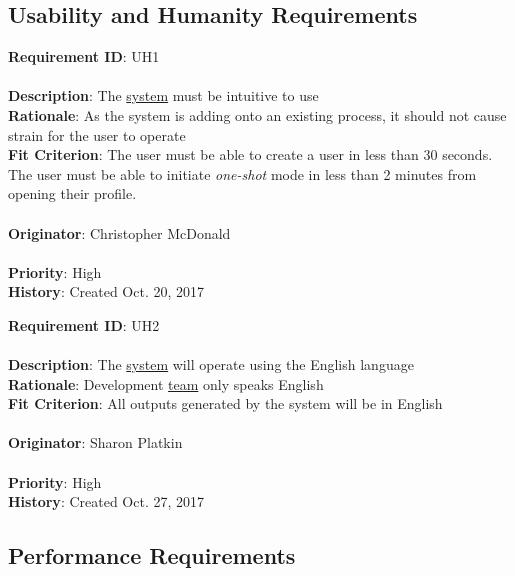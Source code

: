 \documentclass[11pt]{article}
\begin{document}
\subsection{Usability and Humanity Requirements}
\begin{framed}
	\noindent\textbf{Requirement ID}: UH1 \hfill\\\\
	\noindent\textbf{Description}: The \hyperref[sec:definitions]{system} must be intuitive to use \\
	\textbf{Rationale}: As the system is adding onto an existing process, it should not cause strain for the user to operate \\
	\textbf{Fit Criterion}: The user must be able to create a user in less than 30 seconds. The user must be able to initiate \textit{one-shot} mode in less than 2 minutes from opening their profile.  \\\\
	\textbf{Originator}: Christopher McDonald \\\\
	\textbf{Priority}: High \hfill \\
	\noindent\textbf{History}: Created Oct. 20, 2017
\end{framed}

\begin{framed}
	\noindent\textbf{Requirement ID}: UH2 \hfill\\\\
	\noindent\textbf{Description}: The \hyperref[sec:definitions]{system} will operate using the English language \\
	\textbf{Rationale}: Development \hyperref[sec:definitions]{team} only speaks English \\
	\textbf{Fit Criterion}: All outputs generated by the system will be in English  \\\\
	\textbf{Originator}: Sharon Platkin \\\\
	\textbf{Priority}: High \hfill \\
	\noindent\textbf{History}: Created Oct. 27, 2017
\end{framed}

\subsection{Performance Requirements}
\end{document}
